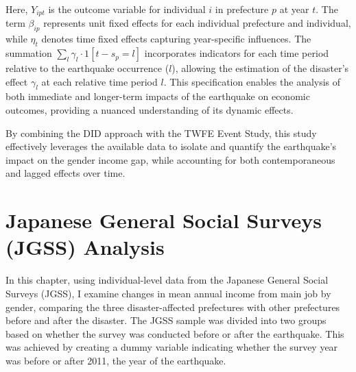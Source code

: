 \documentclass[a4paper,12pt]{article}
\begin{document}
Here, $Y_{ipt}$ is the outcome variable for individual $i$ in prefecture $p$ at year $t$. The term $\beta_{ip}$ represents unit fixed effects for each individual prefecture and individual, while $\eta_{t}$ denotes time fixed effects capturing year-specific influences. The summation $\sum_{l} \gamma_{l} \cdot 1[t - s_{p} = l]$ incorporates indicators for each time period relative to the earthquake occurrence ($l$), allowing the estimation of the disaster's effect $\gamma_{l}$ at each relative time period $l$. This specification enables the analysis of both immediate and longer-term impacts of the earthquake on economic outcomes, providing a nuanced understanding of its dynamic effects.

By combining the DID approach with the TWFE Event Study, this study effectively leverages the available data to isolate and quantify the earthquake's impact on the gender income gap, while accounting for both contemporaneous and lagged effects over time.


\section{Japanese General Social Surveys (JGSS) Analysis}

In this chapter, using individual-level data from the Japanese General Social Surveys (JGSS), I examine changes in mean annual income from main job by gender, comparing the three disaster-affected prefectures with other prefectures before and after the disaster. The JGSS sample was divided into two groups based on whether the survey was conducted before or after the earthquake. This was achieved by creating a dummy variable indicating whether the survey year was before or after 2011, the year of the earthquake.

\begin{table}[h]
\centering
\caption{Longitudinal Sample Size by Disaster Area Status and Survey Year, 2000-2018}
\label{tab:distribution}
\label{table:Longitudinal_sample}
\end{table}
\end{document}

